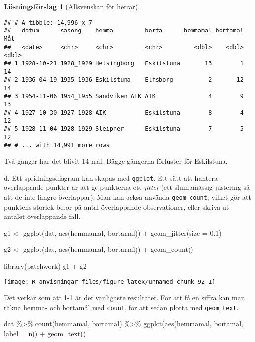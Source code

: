 \documentclass[
]{book}
\newenvironment{Shaded}{\begin{snugshade}}{\end{snugshade}}
\newcommand{\AttributeTok}[1]{\textcolor[rgb]{0.77,0.63,0.00}{#1}}
\newcommand{\FloatTok}[1]{\textcolor[rgb]{0.00,0.00,0.81}{#1}}
\newcommand{\FunctionTok}[1]{\textcolor[rgb]{0.00,0.00,0.00}{#1}}
\newcommand{\NormalTok}[1]{#1}
\newcommand{\OtherTok}[1]{\textcolor[rgb]{0.56,0.35,0.01}{#1}}
\newcommand{\SpecialCharTok}[1]{\textcolor[rgb]{0.00,0.00,0.00}{#1}}
\theoremstyle{definition}
\theoremstyle{definition}
\theoremstyle{definition}
\theoremstyle{definition}
\newtheorem{hypothesis}{Lösningsförslag}[chapter]
\theoremstyle{remark}
\begin{document}
\begin{hypothesis}[Allsvenskan för herrar]
\begin{verbatim}
## # A tibble: 14,996 x 7
##   datum      sasong    hemma         borta      hemmamal bortamal   Mål
##   <date>     <chr>     <chr>         <chr>         <dbl>    <dbl> <dbl>
## 1 1928-10-21 1928_1929 Helsingborg   Eskilstuna       13        1    14
## 2 1936-04-19 1935_1936 Eskilstuna    Elfsborg          2       12    14
## 3 1954-11-06 1954_1955 Sandviken AIK AIK               4        9    13
## 4 1927-10-30 1927_1928 AIK           Eskilstuna        8        4    12
## 5 1928-11-04 1928_1929 Sleipner      Eskilstuna        7        5    12
## # ... with 14,991 more rows
\end{verbatim}

Två gånger har det blivit 14 mål. Bägge gångerna förluster för Eskilstuna.

d. Ett spridningsdiagram kan skapas med \texttt{ggplot}. Ett sätt att hantera överlappande punkter är att ge punkterna ett \emph{jitter} (ett slumpmässig justering så att de inte längre överlappar). Man kan också använda \texttt{geom\_count}, vilket gör att punktens storlek beror på antal överlappande observationer, eller skriva ut antalet överlappande fall.

\begin{Shaded}
\begin{Highlighting}[]
\NormalTok{g1 }\OtherTok{\textless{}{-}} \FunctionTok{ggplot}\NormalTok{(dat, }\FunctionTok{aes}\NormalTok{(hemmamal, bortamal)) }\SpecialCharTok{+}
  \FunctionTok{geom\_jitter}\NormalTok{(}\AttributeTok{size =} \FloatTok{0.1}\NormalTok{)}

\NormalTok{g2 }\OtherTok{\textless{}{-}} \FunctionTok{ggplot}\NormalTok{(dat, }\FunctionTok{aes}\NormalTok{(hemmamal, bortamal)) }\SpecialCharTok{+}
  \FunctionTok{geom\_count}\NormalTok{()}

\FunctionTok{library}\NormalTok{(patchwork)}
\NormalTok{g1 }\SpecialCharTok{+}\NormalTok{ g2}
\end{Highlighting}
\end{Shaded}

\begin{center}\texttt{[image: R-anvisningar\_files/figure-latex/unnamed-chunk-92-1]} \end{center}

Det verkar som att 1-1 är det vanligaste resultatet. För att få en siffra kan man räkna hemma- och bortamål med \texttt{count}, för att sedan plotta med \texttt{geom\_text}.

\begin{Shaded}
\begin{Highlighting}[]
\NormalTok{dat }\SpecialCharTok{\%\textgreater{}\%} 
  \FunctionTok{count}\NormalTok{(hemmamal, bortamal) }\SpecialCharTok{\%\textgreater{}\%} 
  \FunctionTok{ggplot}\NormalTok{(}\FunctionTok{aes}\NormalTok{(hemmamal, bortamal, }\AttributeTok{label =}\NormalTok{ n)) }\SpecialCharTok{+}
  \FunctionTok{geom\_text}\NormalTok{()}
\end{Highlighting}
\end{Shaded}


\end{hypothesis}
\end{document}
